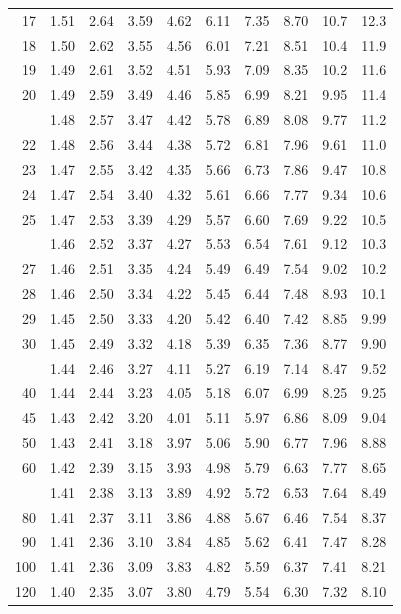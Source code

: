 \documentclass[10pt]{article}
\begin{document}
\begin{longtable}{@{}r!{\vrule width 0.8pt\hspace{0.55em}}rrrrrrrrr@{}}
17 & 1.51 & 2.64 & 3.59 & 4.62 & 6.11 & 7.35 & 8.70 & 10.7 & 12.3 \\
18 & 1.50 & 2.62 & 3.55 & 4.56 & 6.01 & 7.21 & 8.51 & 10.4 & 11.9 \\
19 & 1.49 & 2.61 & 3.52 & 4.51 & 5.93 & 7.09 & 8.35 & 10.2 & 11.6 \\
20 & 1.49 & 2.59 & 3.49 & 4.46 & 5.85 & 6.99 & 8.21 & 9.95 & 11.4 \\
 & 1.48 & 2.57 & 3.47 & 4.42 & 5.78 & 6.89 & 8.08 & 9.77 & 11.2 \\
22 & 1.48 & 2.56 & 3.44 & 4.38 & 5.72 & 6.81 & 7.96 & 9.61 & 11.0 \\
23 & 1.47 & 2.55 & 3.42 & 4.35 & 5.66 & 6.73 & 7.86 & 9.47 & 10.8 \\
24 & 1.47 & 2.54 & 3.40 & 4.32 & 5.61 & 6.66 & 7.77 & 9.34 & 10.6 \\
25 & 1.47 & 2.53 & 3.39 & 4.29 & 5.57 & 6.60 & 7.69 & 9.22 & 10.5 \\
 & 1.46 & 2.52 & 3.37 & 4.27 & 5.53 & 6.54 & 7.61 & 9.12 & 10.3 \\
27 & 1.46 & 2.51 & 3.35 & 4.24 & 5.49 & 6.49 & 7.54 & 9.02 & 10.2 \\
28 & 1.46 & 2.50 & 3.34 & 4.22 & 5.45 & 6.44 & 7.48 & 8.93 & 10.1 \\
29 & 1.45 & 2.50 & 3.33 & 4.20 & 5.42 & 6.40 & 7.42 & 8.85 & 9.99 \\
30 & 1.45 & 2.49 & 3.32 & 4.18 & 5.39 & 6.35 & 7.36 & 8.77 & 9.90 \\
 & 1.44 & 2.46 & 3.27 & 4.11 & 5.27 & 6.19 & 7.14 & 8.47 & 9.52 \\
40 & 1.44 & 2.44 & 3.23 & 4.05 & 5.18 & 6.07 & 6.99 & 8.25 & 9.25 \\
45 & 1.43 & 2.42 & 3.20 & 4.01 & 5.11 & 5.97 & 6.86 & 8.09 & 9.04 \\
50 & 1.43 & 2.41 & 3.18 & 3.97 & 5.06 & 5.90 & 6.77 & 7.96 & 8.88 \\
60 & 1.42 & 2.39 & 3.15 & 3.93 & 4.98 & 5.79 & 6.63 & 7.77 & 8.65 \\
 & 1.41 & 2.38 & 3.13 & 3.89 & 4.92 & 5.72 & 6.53 & 7.64 & 8.49 \\
80 & 1.41 & 2.37 & 3.11 & 3.86 & 4.88 & 5.67 & 6.46 & 7.54 & 8.37 \\
90 & 1.41 & 2.36 & 3.10 & 3.84 & 4.85 & 5.62 & 6.41 & 7.47 & 8.28 \\
100 & 1.41 & 2.36 & 3.09 & 3.83 & 4.82 & 5.59 & 6.37 & 7.41 & 8.21 \\
120 & 1.40 & 2.35 & 3.07 & 3.80 & 4.79 & 5.54 & 6.30 & 7.32 & 8.10 \\

\end{longtable}
\end{document}

